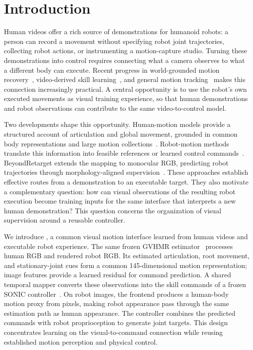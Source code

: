 
\section{Introduction}
Human videos offer a rich source of demonstrations for humanoid robots: a person can record a movement without specifying robot joint trajectories, collecting robot actions, or instrumenting a motion-capture studio. Turning these demonstrations into control requires connecting what a camera observes to what a different body can execute. Recent progress in world-grounded motion recovery~\cite{wham,gvhmr}, video-derived skill learning~\cite{videomimic}, and general motion tracking~\cite{beyondmimic,sonic} makes this connection increasingly practical. A central opportunity is to use the robot's own executed movements as visual training experience, so that human demonstrations and robot observations can contribute to the same video-to-control model.

Two developments shape this opportunity. Human-motion models provide a structured account of articulation and global movement, grounded in common body representations and large motion collections~\cite{smpl,amass,motionx}. Robot-motion methods translate this information into feasible references or learned control commands~\cite{gmr,nmr,sonic}. BeyondRetarget extends the mapping to monocular RGB, predicting robot trajectories through morphology-aligned supervision~\cite{beyondretarget}. These approaches establish effective routes from a demonstration to an executable target. They also motivate a complementary question: how can visual observations of the resulting robot execution become training inputs for the same interface that interprets a new human demonstration? This question concerns the organization of visual supervision around a reusable controller.

We introduce \method, a common visual motion interface learned from human videos and executable robot experience. The same frozen GVHMR estimator~\cite{gvhmr} processes human RGB and rendered robot RGB. Its estimated articulation, root movement, and stationary-joint cues form a common 145-dimensional motion representation; image features provide a learned residual for command prediction. A shared temporal mapper converts these observations into the skill commands of a frozen SONIC controller~\cite{sonic}. On robot images, the frontend produces a human-body motion proxy from pixels, making robot appearance pass through the same estimation path as human appearance. The controller combines the predicted commands with robot proprioception to generate joint targets. This design concentrates learning on the visual-to-command connection while reusing established motion perception and physical control.

